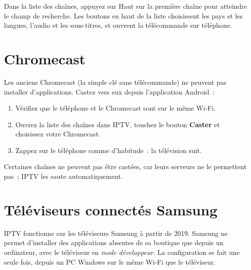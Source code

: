 Dans la liste des chaînes, appuyez sur Haut sur la première chaîne pour
atteindre le champ de recherche. Les boutons en haut de la liste choisissent
les pays et les langues, l'audio et les sous-titres, et ouvrent la
télécommande sur téléphone.


\section{Chromecast}
\label{sec:chromecast}

Les anciens Chromecast (la simple clé sans télécommande) ne peuvent pas
installer d'applications. Castez vers eux depuis l'application Android~:
\begin{enumerate}
  \item Vérifiez que le téléphone et le Chromecast sont sur le même Wi-Fi.
  \item Ouvrez la liste des chaînes dans IPTV, touchez le bouton
        \textbf{Caster} et choisissez votre Chromecast.
  \item Zappez sur le téléphone comme d'habitude~: la télévision suit.
\end{enumerate}
Certaines chaînes ne peuvent pas être castées, car leurs serveurs ne le
permettent pas~; IPTV les saute automatiquement.

\section{Téléviseurs connectés Samsung}

IPTV fonctionne sur les téléviseurs Samsung à partir de 2019. Samsung ne
permet d'installer des applications absentes de sa boutique que depuis un
ordinateur, avec le téléviseur en \emph{mode développeur}. La configuration
se fait une seule fois, depuis un PC Windows sur le même Wi-Fi que le
téléviseur.

